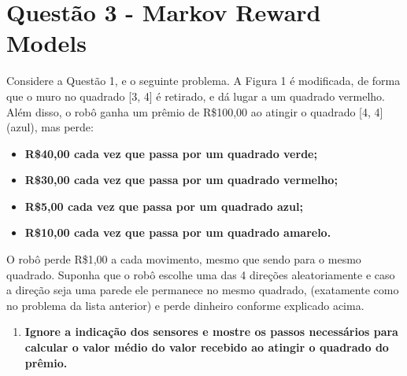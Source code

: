 \section*{Questão 3 - Markov Reward Models}

Considere a Questão 1, e o seguinte problema. A Figura 1 é modificada, de forma que o muro no quadrado [3, 4] é retirado, e dá lugar a um quadrado vermelho. Além disso, o robô ganha um prêmio de R\$100,00 ao atingir o quadrado [4, 4] (azul), mas perde:

\begin{itemize}
    \item \textbf{R\$40,00 cada vez que passa por um quadrado verde;}
    \item \textbf{R\$30,00 cada vez que passa por um quadrado vermelho;}
    \item \textbf{R\$5,00 cada vez que passa por um quadrado azul;}
    \item \textbf{R\$10,00 cada vez que passa por um quadrado amarelo.}
\end{itemize}

O robô perde R\$1,00 a cada movimento, mesmo que sendo para o mesmo quadrado. Suponha que o robô escolhe uma das 4 direções aleatoriamente e caso a direção seja uma parede ele permanece no mesmo quadrado, (exatamente como no problema da lista anterior) e perde dinheiro conforme explicado acima.

\begin{enumerate}
    \item \textbf{Ignore a indicação dos sensores e mostre os passos necessários para calcular o valor médio do valor recebido ao atingir o quadrado do prêmio.}
\end{enumerate}

